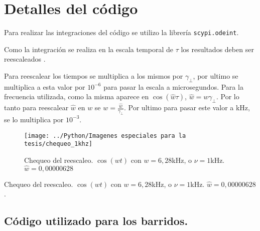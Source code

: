 \section{Detalles del código}

Para realizar las integraciones del código se utilizo la librería \texttt{scypi.odeint}.

Como la integración se realiza en la  escala temporal de $\tau$ los resultados deben ser reescaleados .

Para reescalear los tiempos se multiplica a los mismos por $\gamma_{\bot}$, por ultimo se multiplica a esta valor por $10^{-6}$ para pasar la escala a microsegundos.
Para la frecuencia utilizada, como la misma aparece en $\cos(\hat{w}\tau)$, $\hat{w}=w \gamma_{\bot}$. Por lo tanto para reescalear $\hat{w}$ en $w$ se $w=\frac{\hat{w}}{\gamma_{\bot}}$. Por ultimo para pasar este valor a kHz, se lo multiplica por  $10^{-3}$.

\begin{figure}[h]
	\texttt{[image: ../Python/Imagenes especiales para la tesis/chequeo\_1khz]}
	\caption{Chequeo del reescaleo. $\cos(wt)$ con $w=6,28$kHz, o $\nu = 1$kHz. $\hat{w}=0,00000628$}
\end{figure}

Chequeo del reescaleo. $\cos(wt)$ con $w=6,28$kHz, o $\nu = 1$kHz. $\hat{w}=0,00000628$ .

	\subsection{Código utilizado para los barridos.}
	
